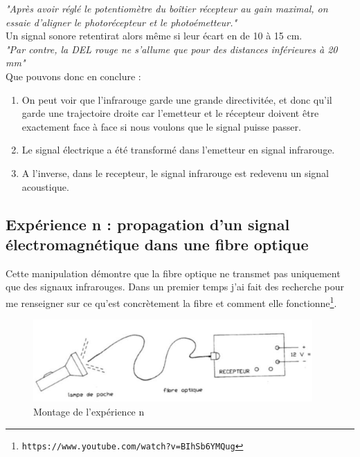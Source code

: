 \documentclass[a4paper]{article}
\begin{document}
\emph{"Après avoir réglé le potentiomètre du boîtier récepteur au gain maximal,
on essaie d'aligner le photorécepteur et le photoémetteur."}\\
Un signal sonore retentirat alors même si leur écart en de 10 à 15 cm.\\
\emph{"Par contre, la DEL rouge ne s'allume que pour des distances inférieures à 20 mm"}\\[0.4cm]
Que pouvons donc en conclure :

\begin{enumerate}
    \item On peut voir que l'infrarouge garde une grande directivitée, et donc qu'il garde une trajectoire droite car l'emetteur et le récepteur doivent être exactement face à face si nous voulons que le signal puisse passer.
    \item Le signal électrique a été transformé dans l'emetteur en signal infrarouge.
    \item A l'inverse, dans le recepteur, le signal infrarouge est redevenu un signal acoustique.
\end{enumerate}










\subsection{Expérience n : propagation d'un signal électromagnétique dans une fibre optique}





Cette manipulation démontre que la fibre optique ne transmet pas   uniquement que des signaux infrarouges. Dans un premier temps j'ai fait des recherche pour me renseigner sur ce qu’est concrètement la fibre et comment elle fonctionne\footnote{\texttt{https://www.youtube.com/watch?v=BIhSb6YMQug}}.

\begin{figure}[H]
    \centering
    \includegraphics[width=0.95\textwidth]{images/montage02.PNG}
    \caption{Montage de l'expérience n}
    \label{fig:montage02}
\end{figure}
\end{document}
